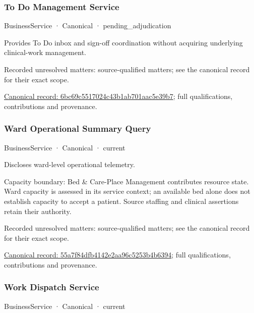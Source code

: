 \subsubsection{To Do Management Service}

\label{element:6bc69c5517024c43b1ab701aac5e39b7}
{\small BusinessService · Canonical · pending\_adjudication}\par

Provides To Do inbox and sign-off coordination without acquiring underlying clinical-work management.


{\small Recorded unresolved matters: source-qualified matters; see the canonical record for their exact scope.}\par
{\footnotesize \href{../../../../continuum/business/business-service/6bc69c5517024c43b1ab701aac5e39b7.md}{Canonical record: 6bc69c5517024c43b1ab701aac5e39b7}; full qualifications, contributions and provenance.}\par
\subsubsection{Ward Operational Summary Query}

\label{element:55a7f84dfb4142e2aa96c5253b4b6394}
{\small BusinessService · Canonical · current}\par

Discloses ward-level operational telemetry.



Capacity boundary: Bed \& Care-Place Management contributes resource state. Ward capacity is assessed in its service context; an available bed alone does not establish capacity to accept a patient. Source staffing and clinical assertions retain their authority.


{\small Recorded unresolved matters: source-qualified matters; see the canonical record for their exact scope.}\par
{\footnotesize \href{../../../../continuum/business/business-service/55a7f84dfb4142e2aa96c5253b4b6394.md}{Canonical record: 55a7f84dfb4142e2aa96c5253b4b6394}; full qualifications, contributions and provenance.}\par
\subsubsection{Work Dispatch Service}

\label{element:7410926f15d3480eaa856d998d67d83f}
{\small BusinessService · Canonical · current}\par

